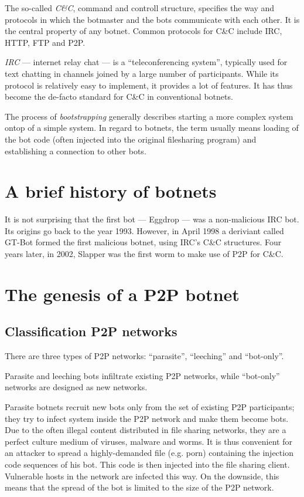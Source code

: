 \documentclass{llncs}
\begin{document}
The so-called {\it C\&C}, command and controll structure, specifies
the way and protocols in which the botmaster and the bots communicate
with each other. It is the central property of any botnet. Common
protocols for C\&C include IRC, HTTP, FTP and P2P.\cite{borgaonkar2010analysis}

{\it IRC} --- internet relay chat --- is a ``teleconferencing
system''\cite{irc}, typically used for text chatting in channels
joined by a large number of participants. While its protocol is
relatively easy to implement, it provides a lot of features. It has
thus become the de-facto standard for C\&C in conventional botnets.

The process of {\it bootstrapping} generally describes starting a more
complex system ontop of a simple system. In regard to botnets, the
term usually means loading of the bot code (often injected into the
original filesharing program) and establishing a connection to other
bots.\cite{wang2009systematic}

\section{A brief history of botnets}
It is not surprising that the first bot --- Eggdrop --- was a
non-malicious IRC bot. Its origins go back to the year 1993. However,
in April 1998 a deriviant called GT-Bot formed the first malicious
botnet, using IRC's C\&C structures. Four years later, in 2002,
Slapper was the first worm to make use of P2P for
C\&C.\cite{li2009botnet}

\section{The genesis of a P2P botnet}


\subsection{Classification P2P networks}
\label{ClassificP2P}
There are three types of P2P networks: ``parasite'', ``leeching'' and
``bot-only''.\cite{wang2009systematic} 

Parasite and leeching bots infiltrate existing P2P networks, while
``bot-only'' networks are designed as new networks. 

Parasite botnets recruit new bots only from the set of existing P2P
participants; they try to infect system inside the P2P network and
make them become bots. Due to the often illegal content distributed in
file sharing networks, they are a perfect culture medium of viruses,
malware and worms. It is thus convenient for an attacker to spread a
highly-demanded file (e.g. porn) containing the injection code
sequences of his bot. This code is then injected into the file sharing
client. Vulnerable hosts in the network are infected this way. On the
downside, this means that the spread of the bot is limited to the size
of the P2P network.
\end{document}
